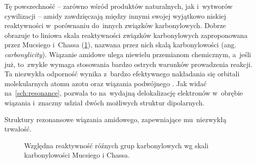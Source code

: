 Tę powszechność \--- zarówno wśród produktów naturalnych, jak i~wytworów cywilizacji \---
  amidy zawdzięczają między innymi swojej wyjątkowo niskiej reaktywności w~porównaniu
  do~innych związków karbonylowych.
Dobrze obrazuje to liniowa skala reaktywności związków karbonylowych zaproponowana
  przez Mucsiego i~Chassa (\cref{fig:carbonyl-scale}),
  nazwana przez nich skalą karbonylowości (ang. \textit{carbonylicity}).
Wiązanie amidowe ulega niewielu przemianom chemicznym, a~jeśli już,
  to~zwykle wymaga stosowania bardzo ostrych warunków prowadzenia reakcji.
Ta niezwykła odporność wynika z~bardzo efektywnego nakładania się orbitali 
  molekularnych atomu azotu oraz \textpi{} wiązania podwójnego .
Jak widać na~\cref{sch:resonance}, pozwala to na~wydajną delokalizację elektronów
  w~obrębie wiązania i~znaczny udział dwóch możliwych struktur dipolarnych.
\begin{marginscheme}
  
  \caption{
    Struktury rezonansowe wiązania amidowego, zapewniające mu~niezwykłą trwałość.
  }
  \label{sch:resonance}
\end{marginscheme}

\begin{figure}
  \centering
  
  \caption{
    Względna reaktywność róźnych grup karbonylowych
    wg skali karbonylowości Mucsiego i Chassa.
  }
  \label{fig:carbonyl-scale}
\end{figure}


